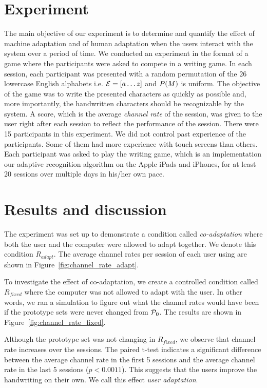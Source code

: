 \documentclass{sigchi}
\begin{document}
\section{Experiment}
\label{sec:experiment}

The main objective of our experiment is to determine and quantify the
effect of machine adaptation and of human adaptation when the users
interact with the system over a period of time.  We conducted an
experiment in the format of a game where the participants were asked
to compete in a writing game. In each session, each participant was
presented with a random permutation of the 26 lowercase English
alphabets i.e. $\mathcal{E} = \left[ a \ldots z \right]$ and
$P(M)$ is uniform. The objective of the game was to write the
presented characters as quickly as possible and, more importantly, the
handwritten characters should be recognizable by the system. A score,
which is the average {\it channel rate} of the session, was given to
the user right after each session to reflect the performance of the
session. There were 15 participants in this experiment. We did not
control past experience of the participants. Some of them had more
experience with touch screens than others. Each participant was asked
to play the writing game, which is an implementation our adaptive
recognition algorithm on the Apple iPads and iPhones, for at least 20
sessions over multiple days in his/her own pace.


\section{Results and discussion}
\label{sec:results}

The experiment was set up to demonstrate a condition called {\em
  co-adaptation} where both the user and the computer were allowed to
adapt together. We denote this condition $R_{adapt}$. The average
channel rates per session of each user using are shown in
Figure~\ref{fig:channel_rate_adapt}. 

To investigate the effect of co-adaptation, we create a controlled 
condition called $R_{fixed}$ where the computer was not allowed to
adapt with the user. In other words, we ran a simulation to figure out what the
channel rates would have been if the prototype sets were never changed
from $\mathcal{P}_0$. The results are shown in
Figure~\ref{fig:channel_rate_fixed}.

Although the prototype set was not changing in $R_{fixed}$, we observe
that channel rate increases over the sessions. The paired t-test
indicates a significant difference between the average channel rate in
the first 5 sessions and the average channel rate in the last 5
sessions ($p < 0.0011$). This suggests that the users improve the
handwriting on their own. We call this effect {\em user
  adaptation}.
\end{document}
